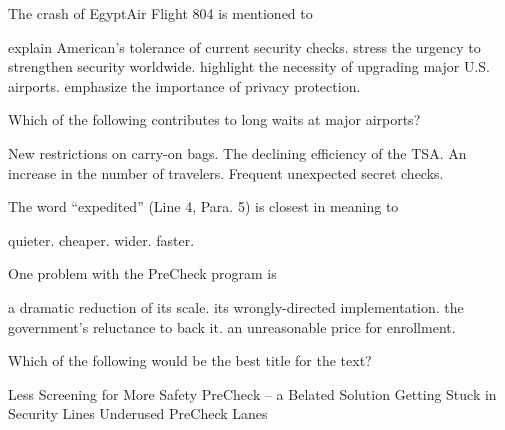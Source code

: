 \item The crash of EgyptAir Flight 804 is mentioned to
\begin{tasks}
	\task explain American's tolerance of current security checks.
	\task stress the urgency to strengthen security worldwide.
	\task highlight the necessity of upgrading major U.S. airports.
	\task emphasize the importance of privacy protection.
\end{tasks}
\item Which of the following contributes to long waits at major airports?
\begin{tasks}
	\task New restrictions on carry-on bags.
	\task The declining efficiency of the TSA.
	\task An increase in the number of travelers.
	\task Frequent unexpected secret checks.
\end{tasks}
\item The word ``expedited'' (Line 4, Para. 5) is closest in meaning to
\begin{tasks}
	\task quieter.
	\task cheaper.
	\task wider.
	\task faster.
\end{tasks}
\item One problem with the PreCheck program is
\begin{tasks}
	\task a dramatic reduction of its scale.
	\task its wrongly-directed implementation.
	\task the government's reluctance to back it.
	\task an unreasonable price for enrollment.
\end{tasks}
\item Which of the following would be the best title for the text?
\begin{tasks}
	\task Less Screening for More Safety
	\task PreCheck – a Belated Solution
	\task Getting Stuck in Security Lines
	\task Underused PreCheck Lanes
\end{tasks}